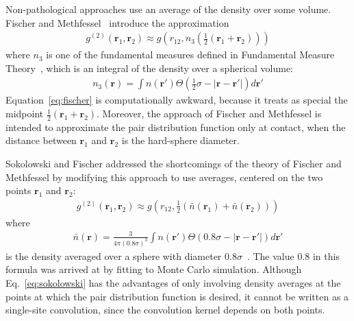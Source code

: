 \documentclass[letterpaper,twocolumn,amsmath,amssymb,pre,aps,10pt]{revtex4-1}
\newcommand{\rr}{\textbf{r}}
\begin{document}
Non-pathological approaches use an average of the density over some
volume. Fischer and Methfessel~\cite{fischer1980born} introduce the
approximation
\begin{align}
  g^{(2)}(\rr_1,\rr_2) \approx g\left(r_{12}, n_3\left(\tfrac12
  (\rr_1+\rr_2)\right)\right)
  \label{eq:fischer}
\end{align}
where $n_3$ is one of the fundamental measures defined in Fundamental
Measure Theory~\cite{rosenfeld1989free}, which is an integral of the
density over a spherical volume:
\begin{align}
  n_3(\rr) = \int n(\rr')\Theta(\tfrac12 \sigma - |\rr-\rr'|) d\rr'
\end{align}
Equation~\ref{eq:fischer} is computationally awkward, because it
treats as special the midpoint $\tfrac12(\rr_1+\rr_2)$.  Moreover, the
approach of Fischer and Methfessel is intended to approximate the pair
distribution function only at contact, when the distance between
$\rr_1$ and $\rr_2$ is the hard-sphere diameter.

Sokolowski and Fischer addressed the shortcomings of the theory of
Fischer and Methfessel by modifying this approach to use
averages, centered on the two points $\rr_1$ and $\rr_2$:
\begin{align}
  g^{(2)}(\rr_1,\rr_2) \approx g\left(r_{12},
  \tfrac12(\bar{n}(\rr_1)+\bar{n}(\rr_2))\right)
  \label{eq:sokolowski}
\end{align}
where
\begin{align}
  \bar{n}(\rr) = \frac{3}{4\pi (0.8\sigma)^3}\int n(\rr')\Theta(0.8\sigma - |\rr-\rr'|) d\rr'
\end{align}
is the density averaged over a sphere with diameter
$0.8\sigma$~\cite{sokolowski1992role}.  The value 0.8 in this formula
was arrived at by fitting to Monte Carlo simulation.  Although
Eq.~\ref{eq:sokolowski} has the advantages of only involving density
averages at the points at which the pair distribution function is
desired, it cannot be written as a single-site convolution, since the
convolution kernel depends on both points.
\end{document}
